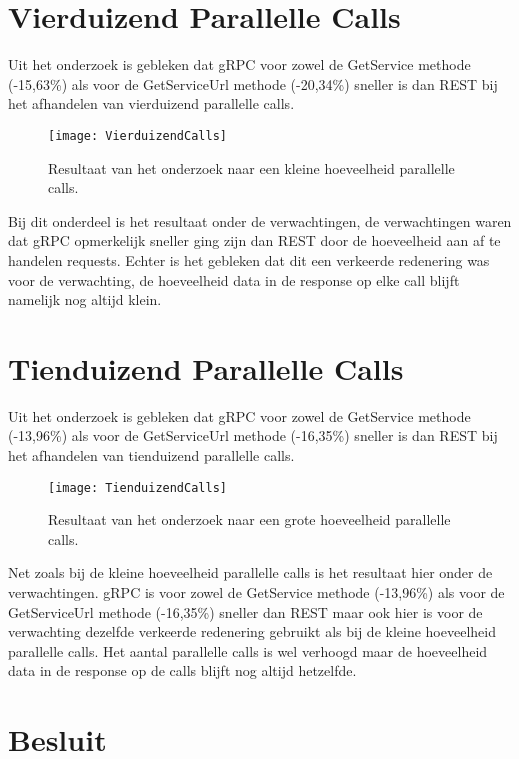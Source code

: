 \section{Vierduizend Parallelle Calls}
\label{sec:Vierduizend parallelle calls}
Uit het onderzoek is gebleken dat gRPC voor zowel de GetService methode (-15,63\%) als voor de GetServiceUrl methode (-20,34\%) sneller is dan REST bij het afhandelen van vierduizend parallelle calls.
\begin{figure}[H]
    \centering
    \texttt{[image: VierduizendCalls]}
    \caption[Resultaten van vierduizend parallelle calls]{Resultaat van het onderzoek naar een kleine hoeveelheid parallelle calls.}
    \label{fig:VierduizendCallsResult}
\end{figure}

Bij dit onderdeel is het resultaat onder de verwachtingen, de verwachtingen waren dat gRPC opmerkelijk sneller ging zijn dan REST door de hoeveelheid aan af te handelen requests. Echter is het gebleken dat dit een verkeerde redenering was voor de verwachting, de hoeveelheid data in de response op elke call blijft namelijk nog altijd klein.

\section{Tienduizend Parallelle Calls}
\label{sec:Tienduizend parallelle calls}
Uit het onderzoek is gebleken dat gRPC voor zowel de GetService methode (-13,96\%) als voor de GetServiceUrl methode (-16,35\%) sneller is dan REST bij het afhandelen van tienduizend parallelle calls.
\begin{figure}[H]
    \centering
    \texttt{[image: TienduizendCalls]}
    \caption[Resultaten van tienduizend parallelle calls]{Resultaat van het onderzoek naar een grote hoeveelheid parallelle calls.}
    \label{fig:TienduizendCallsResult}
\end{figure}

Net zoals bij de kleine hoeveelheid parallelle calls is het resultaat hier onder de verwachtingen. gRPC is voor zowel de GetService methode (-13,96\%) als voor de GetServiceUrl methode (-16,35\%) sneller dan REST maar ook hier is voor de verwachting dezelfde verkeerde redenering gebruikt als bij de kleine hoeveelheid parallelle calls. Het aantal parallelle calls is wel verhoogd maar de hoeveelheid data in de response op de calls blijft nog altijd hetzelfde.

\section{Besluit}
\label{sec:Besluit}

